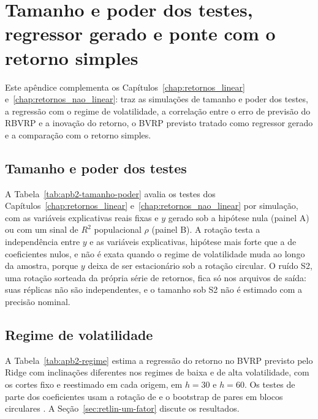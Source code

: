 \chapter{Tamanho e poder dos testes, regressor gerado e ponte com o retorno simples}
\label{app:b2}

Este apêndice complementa os Capítulos~\ref{chap:retornos_linear}
e~\ref{chap:retornos_nao_linear}: traz as simulações de tamanho e poder dos
testes, a regressão com o regime de volatilidade, a correlação entre o erro de
previsão do RBVRP e a inovação do retorno, o BVRP previsto tratado como
regressor gerado e a comparação com o retorno simples.

\section{Tamanho e poder dos testes}
\label{sec:apb2-tamanho}

A Tabela~\ref{tab:apb2-tamanho-poder} avalia os testes dos
Capítulos~\ref{chap:retornos_linear} e~\ref{chap:retornos_nao_linear} por
simulação, com as variáveis explicativas reais fixas e $y$ gerado sob a
hipótese nula (painel A) ou com um sinal de $R^2$ populacional $\rho$
(painel B). A rotação testa a independência entre $y$ e as variáveis
explicativas, hipótese mais forte que a de coeficientes nulos, e não é exata
quando o regime de volatilidade muda ao longo da amostra, porque $y$ deixa de
ser estacionário sob a rotação circular. O ruído S2, uma rotação sorteada da
própria série de retornos, fica só nos arquivos de saída: suas réplicas não são
independentes, e o tamanho sob S2 não é estimado com a precisão nominal.



\section{Regime de volatilidade}
\label{sec:apb2-regime}

A Tabela~\ref{tab:apb2-regime} estima a regressão do retorno no BVRP previsto
pelo Ridge com inclinações diferentes nos regimes de baixa e de alta
volatilidade, com os cortes fixo e reestimado em cada origem, em $h = 30$ e
$h = 60$. Os testes de parte dos coeficientes usam a rotação de
\citet{freedman1983nonstochastic} e o bootstrap de pares em blocos circulares
\citep{politis1992circular}. A Seção~\ref{sec:retlin-um-fator} discute os
resultados.

